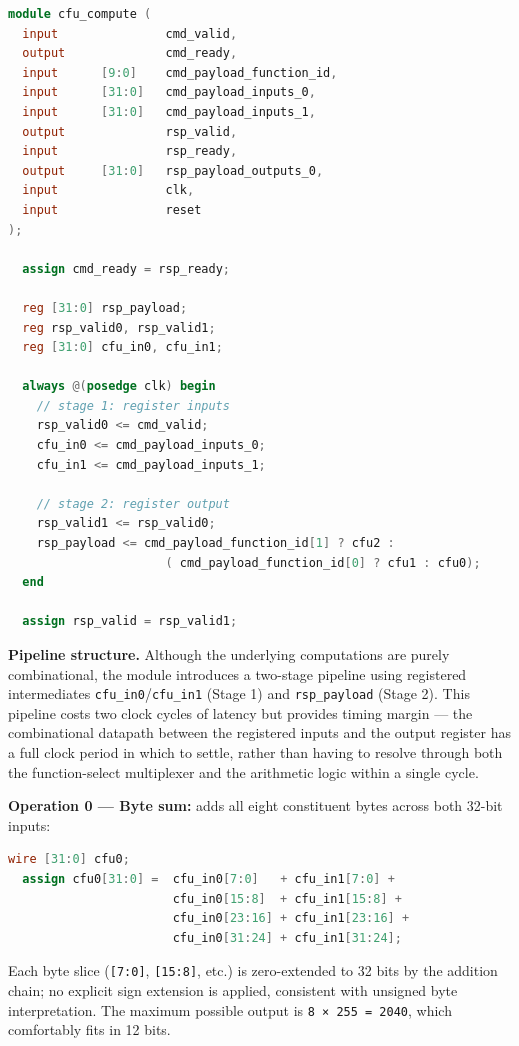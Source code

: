\begin{lstlisting}[style=mystyle, language=Verilog]
module cfu_compute (
  input               cmd_valid,
  output              cmd_ready,
  input      [9:0]    cmd_payload_function_id,
  input      [31:0]   cmd_payload_inputs_0,
  input      [31:0]   cmd_payload_inputs_1,
  output              rsp_valid,
  input               rsp_ready,
  output     [31:0]   rsp_payload_outputs_0,
  input               clk,
  input               reset
);

  assign cmd_ready = rsp_ready;

  reg [31:0] rsp_payload;
  reg rsp_valid0, rsp_valid1;
  reg [31:0] cfu_in0, cfu_in1;

  always @(posedge clk) begin
    // stage 1: register inputs
    rsp_valid0 <= cmd_valid;
    cfu_in0 <= cmd_payload_inputs_0;
    cfu_in1 <= cmd_payload_inputs_1;

    // stage 2: register output
    rsp_valid1 <= rsp_valid0;
    rsp_payload <= cmd_payload_function_id[1] ? cfu2 :
                      ( cmd_payload_function_id[0] ? cfu1 : cfu0);
  end

  assign rsp_valid = rsp_valid1;
\end{lstlisting}

\textbf{Pipeline structure.} Although the underlying computations are purely combinational, the module introduces a two-stage pipeline using registered intermediates \texttt{cfu\_in0}/\texttt{cfu\_in1} (Stage 1) and \texttt{rsp\_payload} (Stage 2). This pipeline costs two clock cycles of latency but provides timing margin — the combinational datapath between the registered inputs and the output register has a full clock period in which to settle, rather than having to resolve through both the function-select multiplexer and the arithmetic logic within a single cycle.

\textbf{Operation 0 — Byte sum:} adds all eight constituent bytes across both 32-bit inputs:

\begin{lstlisting}[style=mystyle, language=Verilog]
  wire [31:0] cfu0;
  assign cfu0[31:0] =  cfu_in0[7:0]   + cfu_in1[7:0] +
                       cfu_in0[15:8]  + cfu_in1[15:8] +
                       cfu_in0[23:16] + cfu_in1[23:16] +
                       cfu_in0[31:24] + cfu_in1[31:24];
\end{lstlisting}

Each byte slice (\texttt{[7:0]}, \texttt{[15:8]}, etc.) is zero-extended to 32 bits by the addition chain; no explicit sign extension is applied, consistent with unsigned byte interpretation. The maximum possible output is \texttt{8 × 255 = 2040}, which comfortably fits in 12 bits.

